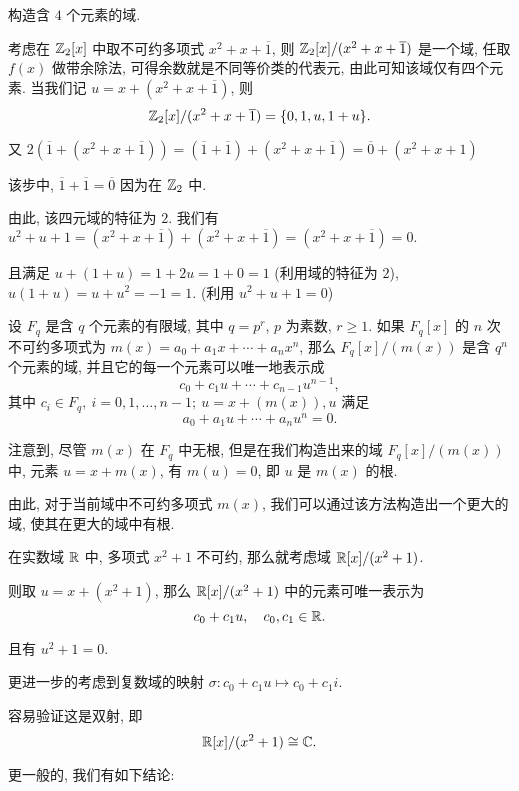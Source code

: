 \begin{example}
	构造含 $4$ 个元素的域.

	\begin{solution}
	 考虑在 $\mathbb Z_2[x]$ 中取不可约多项式 $x^2+x+\overline{1}$, 则 $\mathbb Z_2[x]/(x^2+x+\overline{1})$ 是一个域, 任取 $f(x)$ 做带余除法, 可得余数就是不同等价类的代表元, 由此可知该域仅有四个元素. 当我们记 $u=x+(x^2+x+\overline{1})$, 则 $$\mathbb Z_2[x]/(x^2+x+\overline{1})=\{0,1,u,1+u\}.$$

	 又 $2(\overline{1}+(x^2+x+\overline{1}))=(\overline{1}+\overline{1})+(x^2+x+\overline{1})=\overline{0}+(x^2+x+1)$

	 该步中, $\overline{1}+\overline{1}=\overline{0}$ 因为在 $\mathbb Z_2$ 中.

	 由此, 该四元域的特征为 $2$. 我们有 $u^2+u+1=(x^2+x+\overline{1})+(x^2+x+\overline{1})=(x^2+x+\overline{1})=0.$

	 且满足 $u+(1+u)=1+2u=1+0=1$ (利用域的特征为 $2$), $u(1+u)=u+u^2=-1=1$. (利用 $u^2+u+1=0$)
	\end{solution}
\end{example}

\begin{theorem}
	设 $F_q$ 是含 $q$ 个元素的有限域, 其中 $q=p^r$, $p$ 为素数, $r\geqslant 1$. 如果 $F_q[x]$ 的 $n$ 次不可约多项式为 $m(x) = a_0+a_1x + \cdots+a_nx^n$, 那么 $F_q[x]/(m(x))$ 是含 $q^n$ 个元素的域, 并且它的每一个元素可以唯一地表示成 $$c_0+c_1u+\cdots+c_{n-1}u^{n-1},$$
	其中 $c_i\in F_q,\ i=0,1,\ldots,n-1;\ u=x+(m(x)),u$ 满足 $$a_0+a_1u+\cdots +a_nu^n = 0.$$
\end{theorem}

注意到, 尽管 $m(x)$ 在 $F_q$ 中无根, 但是在我们构造出来的域 $F_q[x]/(m(x))$ 中, 元素 $u=x+m(x)$, 有 $m(u)=0$, 即 $u$ 是 $m(x)$ 的根.

由此, 对于当前域中不可约多项式 $m(x)$, 我们可以通过该方法构造出一个更大的域, 使其在更大的域中有根.

\begin{example}
	在实数域 $\mathbb R$ 中, 多项式 $x^2+1$ 不可约, 那么就考虑域 $\mathbb R[x]/(x^2+1)$.

	则取 $u=x+(x^2+1)$, 那么 $\mathbb R[x]/(x^2+1)$ 中的元素可唯一表示为 $$c_0+c_1u,\quad c_0,c_1\in \mathbb R.$$

	且有 $u^2+1=0$.

	更进一步的考虑到复数域的映射 $\sigma:c_0+c_1u\mapsto c_0+c_1i$.

	容易验证这是双射, 即 $$\mathbb R[x]/(x^2+1)\cong \mathbb C.$$
\end{example}

更一般的, 我们有如下结论:

